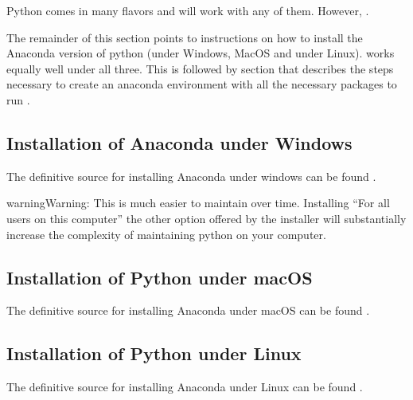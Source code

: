 \documentclass[letterpaper,10pt,english]{jupyterBook}
\begin{document}
\sphinxAtStartPar
Python comes in many flavors and  will work with any of them.  However, .

\sphinxAtStartPar
The remainder of this section points to instructions on how to install the Anaconda version of python (under Windows, MacOS and under Linux).  works equally well under all three. This is followed by section that describes the steps necessary to create an anaconda environment with all the necessary packages to run .


\subsection{Installation of Anaconda under Windows}
\label{\detokenize{content/03_Installation/InstallingPython:installation-of-anaconda-under-windows}}
\sphinxAtStartPar
The definitive source for installing Anaconda under windows can be found .

\begin{sphinxadmonition}{warning}{Warning:}
\sphinxAtStartPar
{}  This is much easier to maintain over time.  Installing “For all users on this computer” the other option offered by the  installer   will substantially increase the complexity of maintaining python on your computer.
\end{sphinxadmonition}


\subsection{Installation of Python under macOS}
\label{\detokenize{content/03_Installation/InstallingPython:installation-of-python-under-macos}}
\sphinxAtStartPar
The definitive source for installing Anaconda under macOS can be found .


\subsection{Installation of Python under Linux}
\label{\detokenize{content/03_Installation/InstallingPython:installation-of-python-under-linux}}
\sphinxAtStartPar
The definitive source for installing Anaconda under Linux can be found .
\end{document}
